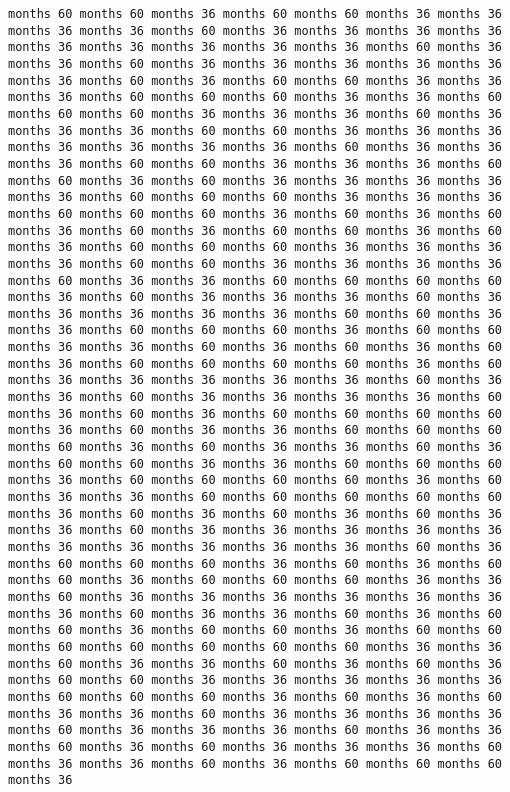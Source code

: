 \documentclass[11pt]{article}
\begin{document}
\begin{Verbatim}[commandchars=\\\{\}, frame=single, framerule=2mm, rulecolor=\color{outerrorbackground}]
months 60 months 60 months 36 months 60 months 60 months 36 months 36 months 36 months 36 months 60 months 36 months 36 months 36 months 36 months 36 months 36 months 36 months 36 months 36 months 60 months 36 months 36 months 60 months 36 months 36 months 36 months 36 months 36 months 36 months 60 months 36 months 60 months 60 months 36 months 36 months 36 months 60 months 60 months 60 months 36 months 36 months 60 months 60 months 60 months 36 months 36 months 36 months 60 months 36 months 36 months 36 months 60 months 60 months 36 months 36 months 36 months 36 months 36 months 36 months 36 months 60 months 36 months 36 months 36 months 60 months 60 months 36 months 36 months 36 months 60 months 60 months 36 months 60 months 36 months 36 months 36 months 36 months 36 months 60 months 60 months 60 months 36 months 36 months 36 months 60 months 60 months 60 months 36 months 60 months 36 months 60 months 36 months 60 months 36 months 60 months 60 months 36 months 60 months 36 months 60 months 60 months 60 months 36 months 36 months 36 months 36 months 60 months 60 months 36 months 36 months 36 months 36 months 60 months 36 months 36 months 60 months 60 months 60 months 60 months 36 months 60 months 36 months 36 months 36 months 60 months 36 months 36 months 36 months 36 months 36 months 60 months 60 months 36 months 36 months 60 months 60 months 60 months 36 months 60 months 60 months 36 months 36 months 60 months 36 months 60 months 36 months 60 months 36 months 60 months 60 months 60 months 60 months 36 months 60 months 36 months 36 months 36 months 36 months 36 months 60 months 36 months 36 months 60 months 36 months 36 months 36 months 36 months 60 months 36 months 60 months 36 months 60 months 60 months 60 months 60 months 36 months 60 months 36 months 36 months 60 months 60 months 60 months 60 months 36 months 60 months 36 months 36 months 60 months 36 months 60 months 60 months 36 months 36 months 60 months 60 months 60 months 36 months 60 months 60 months 60 months 60 months 36 months 60 months 36 months 36 months 60 months 60 months 60 months 60 months 60 months 36 months 60 months 36 months 60 months 36 months 60 months 36 months 36 months 60 months 36 months 36 months 36 months 36 months 36 months 36 months 36 months 36 months 36 months 36 months 60 months 36 months 60 months 60 months 60 months 36 months 60 months 36 months 60 months 60 months 36 months 60 months 60 months 60 months 36 months 36 months 60 months 36 months 36 months 36 months 36 months 36 months 36 months 36 months 60 months 36 months 36 months 60 months 36 months 60 months 60 months 36 months 60 months 60 months 36 months 60 months 60 months 60 months 60 months 60 months 60 months 60 months 36 months 36 months 60 months 36 months 36 months 60 months 36 months 60 months 36 months 60 months 60 months 36 months 36 months 36 months 36 months 36 months 60 months 60 months 60 months 36 months 60 months 36 months 60 months 36 months 36 months 60 months 36 months 36 months 36 months 36 months 60 months 36 months 36 months 36 months 60 months 36 months 36 months 60 months 36 months 60 months 36 months 36 months 36 months 60 months 36 months 36 months 60 months 36 months 60 months 60 months 60 months 36 
\end{Verbatim}
\end{document}
